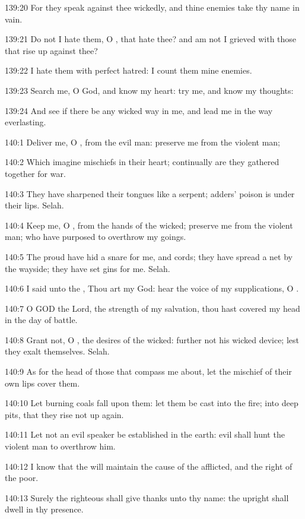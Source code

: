 139:20 For they speak against thee wickedly, and thine enemies take
thy name in vain.

139:21 Do not I hate them, O \LORD, that hate thee? and am not I
grieved with those that rise up against thee?

139:22 I hate them with perfect hatred: I count them mine enemies.

139:23 Search me, O God, and know my heart: try me, and know my
thoughts:

139:24 And see if there be any wicked way in me, and lead me in the
way everlasting.



140:1 Deliver me, O \LORD, from the evil man: preserve me from the
violent man;

140:2 Which imagine mischiefs in their heart; continually are they
gathered together for war.

140:3 They have sharpened their tongues like a serpent; adders' poison
is under their lips. Selah.

140:4 Keep me, O \LORD, from the hands of the wicked; preserve me from
the violent man; who have purposed to overthrow my goings.

140:5 The proud have hid a snare for me, and cords; they have spread a
net by the wayside; they have set gins for me. Selah.

140:6 I said unto the \LORD, Thou art my God: hear the voice of my
supplications, O \LORD.

140:7 O GOD the Lord, the strength of my salvation, thou hast covered
my head in the day of battle.

140:8 Grant not, O \LORD, the desires of the wicked: further not his
wicked device; lest they exalt themselves. Selah.

140:9 As for the head of those that compass me about, let the mischief
of their own lips cover them.

140:10 Let burning coals fall upon them: let them be cast into the
fire; into deep pits, that they rise not up again.

140:11 Let not an evil speaker be established in the earth: evil shall
hunt the violent man to overthrow him.

140:12 I know that the \LORD will maintain the cause of the afflicted,
and the right of the poor.

140:13 Surely the righteous shall give thanks unto thy name: the
upright shall dwell in thy presence.



